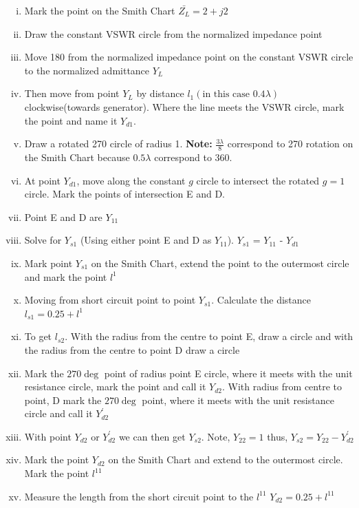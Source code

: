 \begin{exmp}
\begin{enumerate}[(i)]
\item Mark the point on the Smith Chart $\bar{Z_{L}} = 2 + j2$  
\item Draw the constant VSWR circle from the normalized impedance point
\item Move 180\textdegree\; from the normalized impedance point on the constant VSWR circle to the normalized admittance $Y_{L}$
\item Then move from point $Y_{L}$ by distance $l_{1}(\text{in this case } 0.4\lambda)$ clockwise(towards generator). Where the line meets the VSWR circle, mark the point and name it $Y_{d1}$.           
\item Draw a rotated 270\textdegree\; circle of radius 1. \textbf{Note:} $\frac{3\lambda}{8}$ correspond to 270\textdegree\; rotation on the Smith Chart because $0.5\lambda$ correspond to 360\textdegree.
\item At point $Y_{d1}$, move along the constant $g$ circle to intersect the rotated $g = 1$ circle. Mark the points of intersection E and D.
\item Point E and D are $Y_{11}$                        
\item Solve for $Y_{s1}$ (Using either point E and D as $Y_{11}$). $Y_{s1}$ =  $Y_{11}$ -  $Y_{d1}$           
\item Mark point $Y_{s1}$ on the Smith Chart, extend the point to the outermost circle and mark the point $l^{1}$ 
\item Moving from short circuit point to point $Y_{s1}$. Calculate the distance
$ l_{s1} = 0.25 + l^{1} $                                    
\item To get $l_{s2}$. With the radius from the centre to point E, draw a circle and with the radius from the centre to point D draw a circle
\item Mark the $270\deg$ point of radius point E circle, where it meets with the unit resistance circle, mark the point and call it $Y_{d2}$. With radius from centre to point, D mark the $270\deg$ point, where it meets with the unit resistance circle and call it $Y_{d2}^{'}$ 
\item With point $Y_{d2}$ or $Y_{d2}^{'}$ we can then get $Y_{s2}$. Note, $Y_{22}=1$ thus, $Y_{s2}=Y_{22}-Y_{d2}^{'}$
\item Mark the point $Y_{d2}$ on the Smith Chart and extend to the outermost circle. Mark the point $l^{11}$
\item Measure the length from the short circuit point to the $l^{11}$ $Y_{d2} = 0.25 + l^{11}$
\end{enumerate}
\end{exmp}

